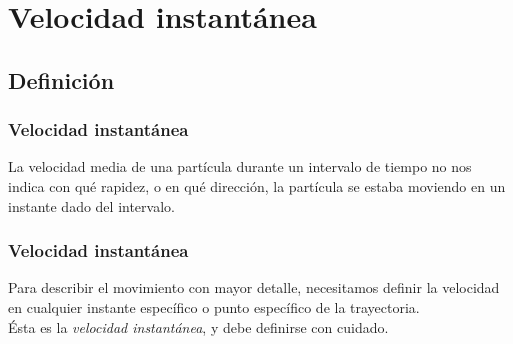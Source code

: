 \section{Velocidad instantánea}
\subsection{Definición}
\begin{frame}
\frametitle{Velocidad instantánea}
La velocidad media de una partícula durante un intervalo de tiempo no nos indica con qué rapidez, o en qué dirección, la partícula se estaba moviendo en un instante dado del intervalo.
\end{frame}
\begin{frame}
\frametitle{Velocidad instantánea}
Para describir el movimiento con mayor detalle, necesitamos definir la velocidad en cualquier instante específico o punto específico de la trayectoria.
\\
\bigskip
\pause
Ésta es la \emph{velocidad instantánea}, y debe definirse con cuidado.
\end{frame}
